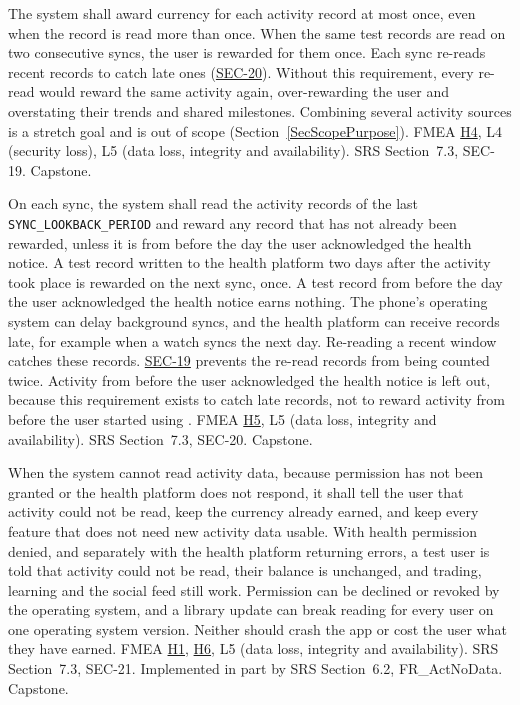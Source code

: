 \documentclass{article}
\newcommand{\reqref}[1]{\hyperref[req:#1]{#1}}
\newcommand{\hazref}[1]{\hyperref[#1]{#1}}
\begin{document}
\begin{description}
{The system shall award currency for each activity record at most once, even
when the record is read more than once.}
{When the same test records are read on two consecutive syncs, the user is
rewarded for them once.}
{Each sync re-reads recent records to catch late ones (\reqref{SEC-20}).
Without this requirement, every re-read would reward the same activity again,
over-rewarding the user and overstating their trends and shared milestones.
Combining several activity sources is a stretch goal and is out of scope
(Section~\ref{SecScopePurpose}).}
{FMEA \hazref{H4}, L4 (security loss), L5 (data loss, integrity and availability).}
{SRS Section~7.3, SEC-19.}
{Capstone.}

{On each sync, the system shall read the activity records of the last
\texttt{SYNC\_LOOKBACK\_PERIOD} and reward any record that has not already been
rewarded, unless it is from before the day the user acknowledged the health
notice.}
{A test record written to the health platform two days after the activity took
place is rewarded on the next sync, once. A test record from before the day the
user acknowledged the health notice earns nothing.}
{The phone's operating system can delay background syncs, and the health
platform can receive records late, for example when a watch syncs the next day.
Re-reading a recent window catches these records. \reqref{SEC-19} prevents the
re-read records from being counted twice. Activity from before the user
acknowledged the health notice is left out, because this requirement exists to
catch late records, not to reward activity from before the user started using
\progname{}.}
{FMEA \hazref{H5}, L5 (data loss, integrity and availability).}
{SRS Section~7.3, SEC-20.}
{Capstone.}

{When the system cannot read activity data, because permission has not been
granted or the health platform does not respond, it shall tell the user that
activity could not be read, keep the currency already earned, and keep every
feature that does not need new activity data usable.}
{With health permission denied, and separately with the health platform
returning errors, a test user is told that activity could not be read, their
balance is unchanged, and trading, learning and the social feed still work.}
{Permission can be declined or revoked by the operating system, and a library
update can break reading for every user on one operating system version.
Neither should crash the app or cost the user what they have earned.}
{FMEA \hazref{H1}, \hazref{H6}, L5 (data loss, integrity and availability).}
{SRS Section~7.3, SEC-21. Implemented in part by SRS Section~6.2,
FR\_ActNoData.}
{Capstone.}


\end{description}
\end{document}
